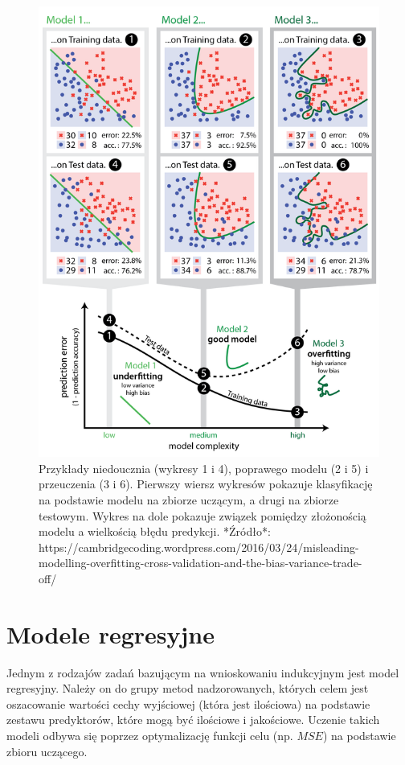 \documentclass[
]{book}
\theoremstyle{plain}
\theoremstyle{definition}
\theoremstyle{definition}
\theoremstyle{definition}
\theoremstyle{definition}
\theoremstyle{definition}
\theoremstyle{remark}
\begin{document}
\begin{figure}
\includegraphics[width=6.1in]{images/unde_over_fitting} \caption{Przykłady niedoucznia (wykresy 1 i 4), poprawego modelu (2 i 5) i przeuczenia (3 i 6). Pierwszy wiersz wykresów pokazuje klasyfikację na podstawie modelu na zbiorze uczącym, a drugi na zbiorze testowym. Wykres na dole pokazuje związek pomiędzy złożonością modelu a wielkością błędu predykcji. *Źródło*: https://cambridgecoding.wordpress.com/2016/03/24/misleading-modelling-overfitting-cross-validation-and-the-bias-variance-trade-off/}\label{fig:unnamed-chunk-10}
\end{figure}

\section{Modele regresyjne}\label{modele-regresyjne}

Jednym z rodzajów zadań bazującym na wnioskowaniu indukcyjnym jest model regresyjny. Należy on do grupy metod nadzorowanych, których celem jest oszacowanie wartości cechy wyjściowej (która jest ilościowa) na podstawie zestawu predyktorów, które mogą być ilościowe i jakościowe. Uczenie takich modeli odbywa się poprzez optymalizację funkcji celu (np. \(MSE\)) na podstawie zbioru uczącego.
\end{document}
